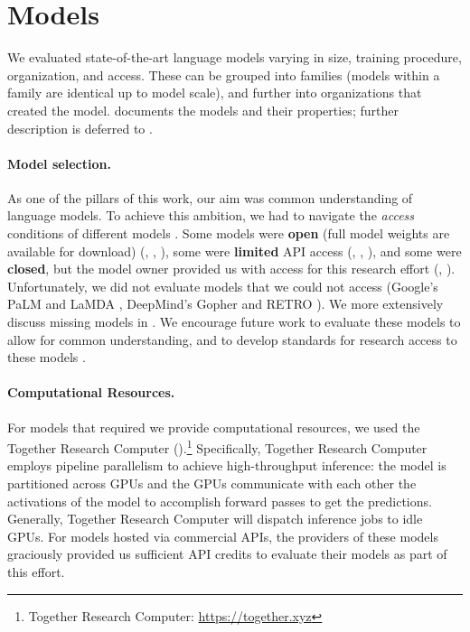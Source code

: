 \hypertarget{models}{\section{Models}}
\label{sec:models}
% 


We evaluated \nummodels state-of-the-art language models varying in size, training procedure, organization, and access.
These \nummodels can be grouped into \nummodelfamilies families (models within a family are identical up to model scale), and further into \nummodelcreators organizations that created the model.
 documents the models and their properties; further description is deferred to .

\paragraph{Model selection.}
As one of the pillars of this work, our aim was common understanding of language models.
To achieve this ambition, we had to navigate the \textit{access} conditions of different models \citep{liang2022community-norms}.
Some models were \textbf{open} (full model weights are available for download) (\eg \gptneox, \optonesevenfive, \bloom), 
some were \textbf{limited} API access (\eg \gptdavinci, \jurassicjumbo, \coherexl), and some were \textbf{closed}, but the model owner provided us with access for this research effort (\anthropic, \mtnlgfivethreezero).
Unfortunately, we did not evaluate models that we could not access (\eg Google's PaLM \citep{chowdhery2022palm} and LaMDA \citep{thoppilan2022lamda}, DeepMind's Gopher \citep{rae2021gopher} and RETRO \citep{borgeaud2022retro}).
We more extensively discuss missing models in .
We encourage future work to evaluate these models to allow for common understanding, and to develop standards for research access to these models \citep{liang2022community-norms}.


\paragraph{Computational Resources.}
For models that required we provide computational resources, we used the 
Together Research Computer ().\footnote{Together Research Computer: \url{https://together.xyz}}
Specifically, Together Research Computer employs pipeline parallelism to achieve high-throughput inference: the model is partitioned across GPUs and the GPUs communicate with each other the activations of the model to accomplish forward passes to get the predictions.
Generally, Together Research Computer will dispatch inference jobs to idle GPUs.
For models hosted via commercial APIs, the providers of these models graciously provided us sufficient API credits to evaluate their models as part of this effort. 

